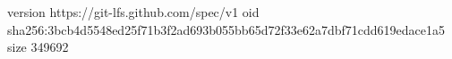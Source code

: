 version https://git-lfs.github.com/spec/v1
oid sha256:3bcb4d5548ed25f71b3f2ad693b055bb65d72f33e62a7dbf71cdd619edace1a5
size 349692
